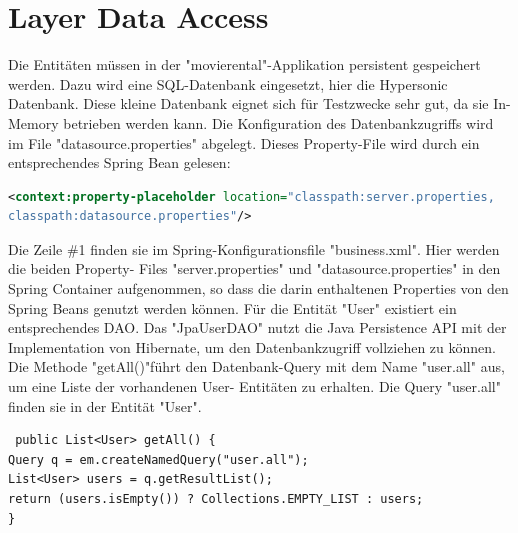 \documentclass[a4paper,10pt]{scrreprt}
\begin{document}
\section{Layer Data Access}
Die Entitäten müssen in der "movierental"-Applikation persistent gespeichert werden. Dazu wird eine
SQL-Datenbank eingesetzt, hier die Hypersonic Datenbank. Diese kleine Datenbank eignet sich für
Testzwecke sehr gut, da sie In-Memory betrieben werden kann. Die Konfiguration des
Datenbankzugriffs wird im File "datasource.properties" abgelegt. Dieses Property-File wird durch ein
entsprechendes Spring Bean gelesen:
\begin{lstlisting}[language=xml]
 <context:property-placeholder location="classpath:server.properties,
classpath:datasource.properties"/>
\end{lstlisting}
Die Zeile \#1 finden sie im Spring-Konfigurationsfile "business.xml". Hier werden die beiden Property-
Files "server.properties" und "datasource.properties" in den Spring Container aufgenommen, so
dass die darin enthaltenen Properties von den Spring Beans genutzt werden können.
Für die Entität "User" existiert ein entsprechendes DAO. Das "JpaUserDAO" nutzt die Java
Persistence API mit der Implementation von Hibernate, um den Datenbankzugriff vollziehen zu
können. Die Methode "getAll()"führt den Datenbank-Query mit dem Name "user.all" aus, um eine Liste der vorhandenen User-
Entitäten zu erhalten. Die Query "user.all" finden sie in der Entität "User".
\begin{lstlisting}
 public List<User> getAll() {
Query q = em.createNamedQuery("user.all");
List<User> users = q.getResultList();
return (users.isEmpty()) ? Collections.EMPTY_LIST : users;
}
\end{lstlisting}
\end{document}
